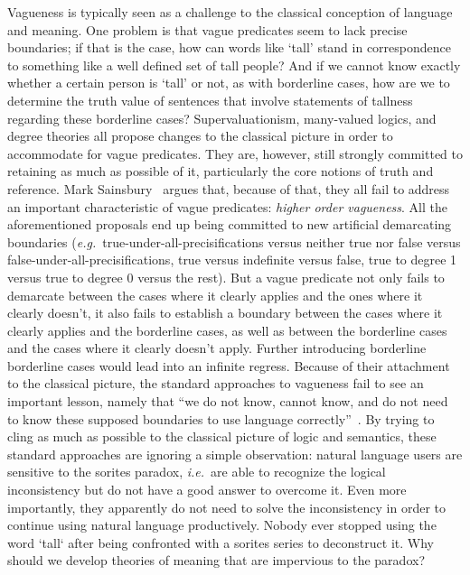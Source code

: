 \documentclass[a4paper]{article}
\begin{document}
Vagueness is typically seen as a challenge to the classical conception of language and meaning.
One problem is that vague predicates seem to lack precise boundaries; if that is the case, how can words like `tall' stand in correspondence to something like a well defined set of tall people?
And if we cannot know exactly whether a certain person is `tall' or not, as with borderline cases, how are we to determine the truth value of sentences that involve statements of tallness regarding these borderline cases?
Supervaluationism, many-valued logics, and degree theories all propose changes to the classical picture in order to accommodate for vague predicates.
They are, however, still strongly committed to retaining as much as possible of it, particularly the core notions of truth and reference.
Mark Sainsbury~\parencite*{sainsbury_concepts_1999} argues that, because of that, they all fail to address an important characteristic of vague predicates: \emph{higher order vagueness}.
All the aforementioned proposals end up being committed to new artificial demarcating boundaries (\emph{e.g.}~true-under-all-precisifications versus neither true nor false versus false-under-all-precisifications, true versus indefinite versus false, true to degree 1 versus true to degree 0 versus the rest).
But a vague predicate not only fails to demarcate between the cases where it clearly applies and the ones where it clearly doesn't, it also fails to establish a boundary between the cases where it clearly applies and the borderline cases, as well as between the borderline cases and the cases where it clearly doesn't apply.
Further introducing borderline borderline cases would lead into an infinite regress.
Because of their attachment to the classical picture, the standard approaches to vagueness fail to see an important lesson, namely that ``we do not know, cannot know, and do not need to know these supposed boundaries to use language correctly''~\parencite*[256]{sainsbury_concepts_1999}.
By trying to cling as much as possible to the classical picture of logic and semantics, these standard approaches are ignoring a simple observation: natural language users are sensitive to the sorites paradox, \emph{i.e.}~are able to recognize the logical inconsistency but do not have a good answer to overcome it.
Even more importantly, they apparently do not need to solve the inconsistency in order to continue using natural language productively.
Nobody ever stopped using the word `tall` after being confronted with a sorites series to deconstruct it.
Why should we develop theories of meaning that are impervious to the paradox?
\end{document}
